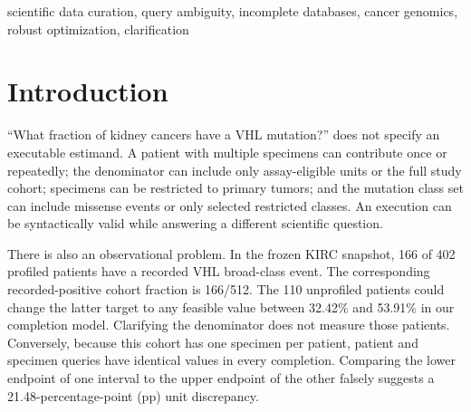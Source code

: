 \begin{abstract}
Scientific query alternatives share the same missing observations, so independent identification intervals can admit impossible disagreements. We present \CLARA{}, a dependence-aware execution guard for cancer-genomics curation. Patient-block completion tables preserve patient aggregation and nested mutation classes, giving attainable discrepancy witnesses and exact strict-threshold decisions without enumerating global worlds. A violating-pair graph governs clarification; a separate identification guard governs numerical answers. In a frozen 12-cohort, 30-gene TCGA registry, two counting engines agree on all 5,760 specifications. Shared-completion certificates remove 3,048 interval-box alarms among 43,200 pairs, including 289 remaining after exact equivalence merging. Under uniform supported intents, expected clarification is 1.773 questions versus 1.833 for the equivalence-merged baseline, a 3.28\% reduction; the best per-family fixed order matches the dynamic program. A separate MSK-IMPACT cohort adds 480 verified specifications and repeated-specimen counting evidence. However, 720 TCGA specifications lack a point answer within 2.5 percentage points. Serial scaling measurements and a replayable typed interface connect these certificates to curation pipelines. Claims concern supplied interpretations and an explicit assay-record completion model, without human or language-model evaluation.
\end{abstract}
\begin{IEEEkeywords}
scientific data curation, query ambiguity, incomplete databases, cancer genomics, robust optimization, clarification
\end{IEEEkeywords}

\section{Introduction}
``What fraction of kidney cancers have a VHL mutation?'' does not specify an executable estimand. A patient with multiple specimens can contribute once or repeatedly; the denominator can include only assay-eligible units or the full study cohort; specimens can be restricted to primary tumors; and the mutation class set can include missense events or only selected restricted classes. An execution can be syntactically valid while answering a different scientific question.

There is also an observational problem. In the frozen KIRC snapshot, 166 of 402 profiled patients have a recorded VHL broad-class event. The corresponding recorded-positive cohort fraction is 166/512. The 110 unprofiled patients could change the latter target to any feasible value between 32.42\% and 53.91\% in our completion model. Clarifying the denominator does not measure those patients. Conversely, because this cohort has one specimen per patient, patient and specimen queries have identical values in every completion. Comparing the lower endpoint of one interval to the upper endpoint of the other falsely suggests a 21.48-percentage-point (pp) unit discrepancy.

